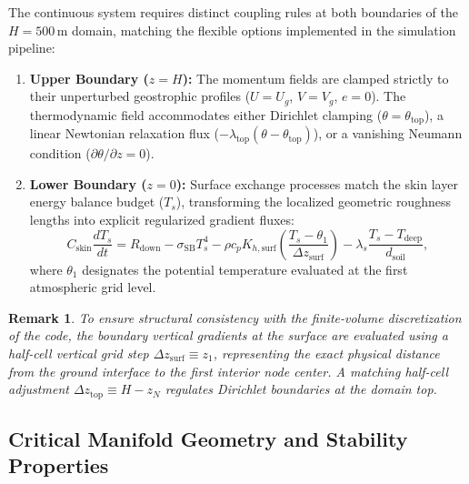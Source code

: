 \documentclass[11pt,letterpaper]{article}
\newtheorem{remark}{Remark}
\begin{document}
The continuous system requires distinct coupling rules at both boundaries of the $H = 500\,\mathrm{m}$ domain, matching the flexible options implemented in the simulation pipeline:
\begin{enumerate}
    \item \textbf{Upper Boundary ($z = H$):} The momentum fields are clamped strictly to their unperturbed geostrophic profiles ($U = U_g$, $V = V_g$, $e = 0$). The thermodynamic field accommodates either Dirichlet clamping ($\theta = \theta_{\mathrm{top}}$), a linear Newtonian relaxation flux ($- \lambda_{\mathrm{top}}(\theta - \theta_{\mathrm{top}})$), or a vanishing Neumann condition ($\partial \theta / \partial z = 0$).
    \item \textbf{Lower Boundary ($z = 0$):} Surface exchange processes match the skin layer energy balance budget ($T_s$), transforming the localized geometric roughness lengths into explicit regularized gradient fluxes:
    \begin{equation}
    C_{\mathrm{skin}} \frac{dT_s}{dt} = R_{\mathrm{down}} - \sigma_{\mathrm{SB}} T_s^4 - \rho c_p K_{h,\mathrm{surf}} \left( \frac{T_s - \theta_1}{\Delta z_{\mathrm{surf}}} \right) - \lambda_s \frac{T_s - T_{\mathrm{deep}}}{d_{\mathrm{soil}}},
    \label{eq:continuous_surface_energy}
    \end{equation}
    where $\theta_1$ designates the potential temperature evaluated at the first atmospheric grid level.
\end{enumerate}

\begin{remark}
To ensure structural consistency with the finite-volume discretization of the code, the boundary vertical gradients at the surface are evaluated using a half-cell vertical grid step $\Delta z_{\mathrm{surf}} \equiv z_1$, representing the exact physical distance from the ground interface to the first interior node center. A matching half-cell adjustment $\Delta z_{\mathrm{top}} \equiv H - z_N$ regulates Dirichlet boundaries at the domain top.
\end{remark}

\subsection{Critical Manifold Geometry and Stability Properties}
\label{subsec:critical_manifold_geometry}
\end{document}
